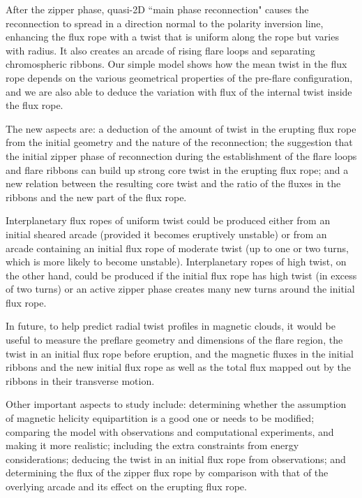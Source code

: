 \documentclass[10pt,namedreferneces]{SolarPhysics}
\begin{document}
\begin{article}
After the zipper phase, quasi-2D ``main phase reconnection" causes the reconnection to spread in a direction normal to the polarity inversion line, enhancing the flux rope with a twist that is uniform along the rope but varies with radius. It also creates an arcade of rising flare loops and separating chromospheric ribbons.
Our simple model shows how the mean twist in the flux rope depends on the various geometrical properties of the pre-flare configuration, and we are also able to deduce the variation with flux of the internal twist inside the flux rope.

The new aspects are: a deduction of the amount of twist in the erupting flux rope from the initial geometry and the nature of the reconnection; the suggestion that the initial zipper phase of reconnection during the establishment of the flare loops and flare ribbons can build up strong core twist in the erupting flux rope; and a new relation between the resulting core twist and the ratio of the fluxes in the ribbons and the new part of the flux rope.

Interplanetary flux ropes of uniform twist could be produced either from an initial sheared arcade (provided it becomes eruptively unstable) or from an arcade containing an initial flux rope of moderate twist (up to one or two turns, which is more likely to become unstable). Interplanetary ropes of high twist, on the other hand, could be produced if the initial flux rope has high twist (in excess of two turns) 
or an active zipper phase creates many new turns around the initial flux rope.

In future, to help predict radial twist profiles in magnetic clouds, it would be useful to measure the preflare geometry and dimensions of the flare region, the twist in an initial flux rope before eruption, and the magnetic fluxes in the initial ribbons and the new initial flux rope as well as the total flux mapped out by the ribbons in their transverse motion.

Other important aspects to study include: determining whether the assumption of magnetic helicity equipartition is a good one or needs to be modified; comparing the model with observations and computational experiments, 
and making it more realistic; including the extra constraints from energy considerations; 
deducing the twist in an initial flux rope from observations; and determining the flux of the zipper flux rope by comparison with that of the overlying arcade and its effect on the erupting flux rope.  


\end{article}
\end{document}
